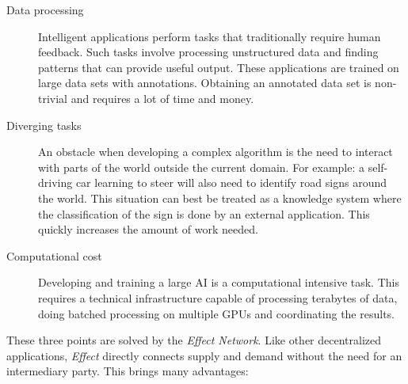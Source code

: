 \documentclass{article}
\begin{document}
\begin{description}
\item[Data processing] Intelligent applications perform tasks that
  traditionally require human feedback. Such tasks involve processing
  unstructured data and finding patterns that can provide useful
  output. These applications are trained on large data sets with
  annotations. Obtaining an annotated data set is non-trivial and
  requires a lot of time and money.
  
\item[Diverging tasks] An obstacle when developing a complex
  algorithm is the need to interact with parts of the world outside
  the current domain. For example: a self-driving car learning to steer 
  will also need to identify road signs around the world. This
  situation can best be treated as a knowledge system where the
  classification of the sign is done by an external application. This
  quickly increases the amount of work needed.
  
\item[Computational cost] Developing and training a large AI is a
  computational intensive task. This requires a technical
  infrastructure capable of processing terabytes of data, doing
  batched processing on multiple GPUs and coordinating the
  results.
\end{description}

These three points are solved by the \emph{Effect Network}. Like other
decentralized applications, \emph{Effect} directly connects supply and
demand without the need for an intermediary party. This brings many
advantages:
\end{document}
